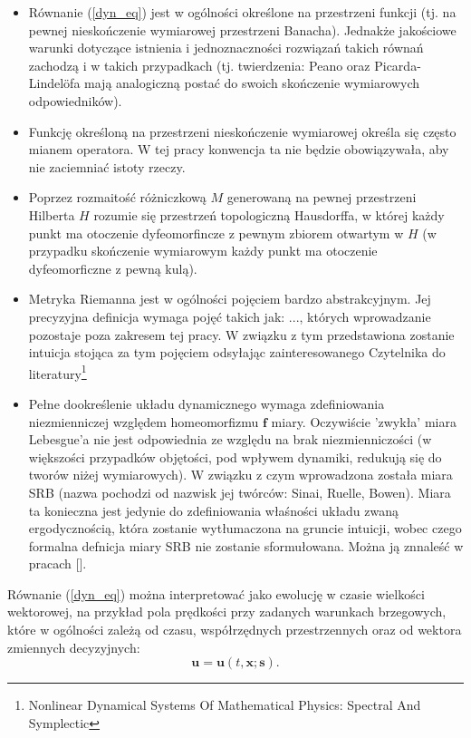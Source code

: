 \documentclass[12pt]{article}
\begin{document}
\begin{itemize}
	\item Równanie (\ref{dyn_eq}) jest w ogólności określone na przestrzeni funkcji (tj. na pewnej nieskończenie wymiarowej przestrzeni Banacha). Jednakże jakościowe warunki dotyczące istnienia i jednoznaczności rozwiązań takich równań zachodzą i w takich przypadkach (tj. twierdzenia: Peano oraz Picarda-Lindelöfa mają analogiczną postać do swoich skończenie wymiarowych odpowiedników).
	\item Funkcję określoną na przestrzeni nieskończenie wymiarowej określa się często mianem operatora. W tej pracy konwencja ta nie będzie obowiązywała, aby nie zaciemniać istoty rzeczy.
	\item Poprzez rozmaitość różniczkową $ M $ generowaną na pewnej przestrzeni Hilberta $ H $ rozumie się przestrzeń topologiczną Hausdorffa, w której każdy punkt ma otoczenie dyfeomorfincze z pewnym zbiorem otwartym w $ H$ (w przypadku skończenie wymiarowym każdy punkt ma otoczenie dyfeomorficzne z pewną kulą).
	\item Metryka Riemanna jest w ogólności pojęciem bardzo abstrakcyjnym. Jej precyzyjna definicja wymaga pojęć takich jak: ..., których wprowadzanie pozostaje poza zakresem tej pracy. W związku z tym przedstawiona zostanie intuicja stojąca za tym pojęciem odsyłając zainteresowanego Czytelnika do literatury\footnote{Nonlinear Dynamical Systems Of Mathematical Physics: Spectral And Symplectic}
	\item Pełne dookreślenie układu dynamicznego wymaga zdefiniowania niezmienniczej względem homeomorfizmu $ \textbf{f} $ miary. Oczywiście 'zwykła' miara Lebesgue'a nie jest odpowiednia ze względu na brak niezmienniczości (w większości przypadków objętości, pod wpływem dynamiki, redukują się do tworów niżej wymiarowych). W związku z czym wprowadzona została miara SRB (nazwa pochodzi od nazwisk jej twórców: Sinai, Ruelle, Bowen). Miara ta konieczna jest jedynie do zdefiniowania właśności układu zwaną ergodycznością, która zostanie wytłumaczona na gruncie intuicji, wobec czego formalna defnicja miary SRB nie zostanie sformułowana. Można ją znnaleść w pracach [].
\end{itemize}
Równanie (\ref{dyn_eq}) można interpretować jako ewolucję w czasie wielkości wektorowej, na przykład pola prędkości przy zadanych warunkach brzegowych, które w ogólności zależą od czasu, współrzędnych przestrzennych oraz od wektora zmiennych decyzyjnych:
\begin{equation}
\textbf{u} = \textbf{u}(t,
\textbf{x};\textbf{s}).
\label{utxs}
\end{equation}
\end{document}

